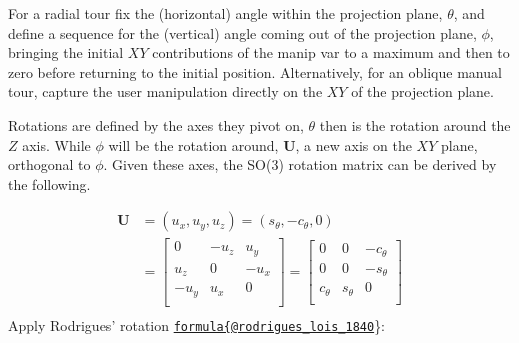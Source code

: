 For a radial tour fix the (horizontal) angle within the projection
plane, \(\theta\), and define a sequence for the (vertical) angle coming
out of the projection plane, \(\phi\), bringing the initial \(XY\)
contributions of the manip var to a maximum and then to zero before
returning to the initial position. Alternatively, for an oblique manual
tour, capture the user manipulation directly on the \(XY\) of the
projection plane.

Rotations are defined by the axes they pivot on, \(\theta\) then is the
rotation around the \(Z\) axis. While \(\phi\) will be the rotation
around, \(\textbf{U}\), a new axis on the \(XY\) plane, orthogonal to
\(\phi\). Given these axes, the SO(3) rotation matrix can be derived by
the following.

\begin{align*}
  \textbf{U} &= (u_x, u_y, u_z) =
  (s_\theta, -c_\theta, 0) \\ 
  &=
  \begin{bmatrix}
  0 & -u_z & u_y  \\
  u_z & 0 & -u_x \\
  -u_y & u_x & 0 \\
  \end{bmatrix} =
  \begin{bmatrix}
    0 & 0 & -c_\theta \\
    0 & 0 & -s_\theta \\
    c_\theta & s_\theta & 0 \\
  \end{bmatrix} \\
  \end{align*} Apply Rodrigues' rotation
\href{mailto:formula\%7B@rodrigues_lois_1840}{\nolinkurl{formula\{@rodrigues\_lois\_1840}}\}:
